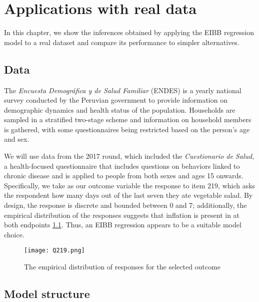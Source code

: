 \chapter{Applications with real data}
\label{cap:applications}

In this chapter, we show the inferences obtained by applying the EIBB regression model to a real dataset and compare its performance to simpler alternatives.

\section{Data}
\label{sec:applications-data}

The \textit{Encuesta Demogr\'afica y de Salud Familiar} (ENDES) is a yearly national survey conducted by the Peruvian government to provide information on demographic dynamics and health status of the population. Households are sampled in a stratified two-stage scheme and information on household members is gathered, with some questionnaires being restricted based on the person's age and sex.

We will use data from the 2017 round, which included the \textit{Cuestionario de Salud}, a health-focused questionnaire that includes questions on behaviors linked to chronic disease and is applied to people from both sexes and ages 15 onwards. Specifically, we take as our outcome variable the response to item 219, which asks the respondent how many days out of the last seven they ate vegetable salad. By design, the response is discrete and bounded between 0 and 7; additionally, the empirical distribution of the responses suggests that inflation is present in at both endpoints \ref{fig:q219}. Thus, an EIBB regression appears to be a suitable model choice.

\begin{figure}
  \texttt{[image: Q219.png]}
  \caption{The empirical distribution of responses for the selected outcome}
  \label{fig:q219}
\end{figure}

\section{Model structure}
\label{sec:applications-structure}

